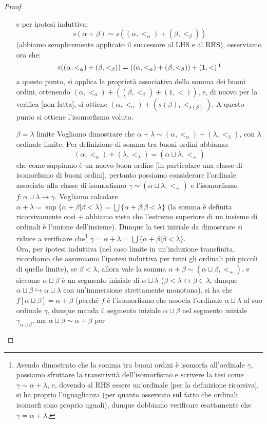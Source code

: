 \documentclass[11pt]{scrartcl}
\begin{document}
\begin{proof}
\begin{itemize}
		e per ipotesi induttiva:
		\[ s(\alpha + \beta) \sim s((\alpha,<_\alpha) + (\beta,<_\beta))
			\]
		(abbiamo semplicemente applicato il successore al LHS e al RHS), osserviamo ora che:
		\[ s((\alpha,<_\alpha) + (\beta,<_\beta)) = ((\alpha,<_\alpha) + (\beta,<_\beta)) + (1,<) \,\footnote{Andrebbe verificato.}
			\]
		a questo punto, si applica la proprietà associativa della somma dei buoni ordini, ottenendo $(\alpha,<_\alpha) + ((\beta,<_\beta) + (1,<))$, e, di nuovo per la verifica [non fatta], si ottiene $(\alpha,<_\alpha) + (s(\beta),<_{s(\beta)})$. A questo punto si ottiene l'isomorfismo voluto.
		\item[$\boxed{\text{$\beta = \lambda$ limite}}$] Vogliamo dimostrare che $\alpha + \lambda \sim (\alpha,<_\alpha) + (\lambda,<_\lambda)$, con $\lambda$ ordinale limite. Per definizione di somma tra buoni ordini abbiamo:
		\[ (\alpha,<_\alpha) + (\lambda,<_\lambda) = (\alpha \sqcup \lambda,<_+)
			\]
		che come sappiamo è un nuovo buon ordine [in particolare una classe di isomorfismo di buoni ordini], pertanto possiamo considerare l'ordinale associato alla classe di isomorfismo $\gamma \sim (\alpha \sqcup \lambda,<_+)$ e l'isomorfismo $f : \alpha \sqcup \lambda \rightarrow \gamma$.
		Vogliamo calcolare $\alpha + \lambda = \sup\{\alpha + \beta | \beta < \lambda\} = \bigcup \{\alpha + \beta | \beta < \lambda\}$ (la somma è definita ricorsivamente così + abbiamo visto che l'estremo superiore di un insieme di ordinali è l'unione dell'insieme). Dunque la tesi  iniziale da dimostrare si riduce a verificare che\footnote{Avendo dimostrato che la somma tra buoni ordini è isomorfa all'ordinale $\gamma$, possiamo sfruttare la transitività dell'isomorfismo e scrivere la tesi come $\gamma \sim \alpha + \lambda$, e, dovendo 
		al RHS essere un'ordinale [per la definizione ricorsiva], si ha proprio l'uguaglianza (per quanto osservato sul fatto che ordinali isomorfi sono proprio uguali), dunque dobbiamo verificare esattamente che $\gamma = \alpha + \lambda$.} $\gamma = \alpha + \lambda = \bigcup\{\alpha + \beta | \beta < \lambda\}$.\\
		Ora, per ipotesi induttiva (nel caso limite in un'induzione transfinita, ricordiamo che assumiamo l'ipotesi induttiva per tutti gli ordinali più piccoli di quello limite), se $\beta < \lambda$, allora vale la somma $\alpha + \beta \sim (\alpha \sqcup \beta,<_+)$, e siccome $\alpha \sqcup \beta$ è un segmento iniziale di $\alpha \sqcup \lambda$ ($\beta < \lambda \leftrightarrow \beta \in \lambda$,
		dunque $\alpha \sqcup \beta \hookrightarrow \alpha \sqcup \lambda$ con un'immersione strettamente monotona), si ha che $f[\alpha \sqcup \beta] = \alpha + \beta$ (perché $f$ è l'isomorfismo che associa l'ordinale $\alpha \sqcup \lambda$ al suo ordinale $\gamma$, dunque manda il segmento iniziale $\alpha \sqcup \beta$ nel segmento iniziale $\gamma_{\alpha \sqcup \beta}$, ma $\alpha \sqcup \beta \sim \alpha + \beta$ per 

\end{itemize}
\end{proof}
\end{document}
